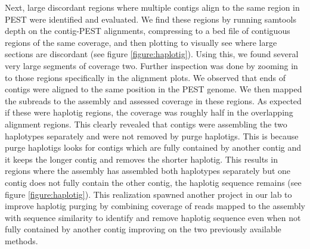 \par{
Next, large discordant regions where multiple contigs align to the same region in PEST were identified and evaluated. We find these regions by running samtools depth on the contig-PEST alignments, compressing to a bed file of contiguous regions of the same coverage, and then plotting to visually see where large sections are discordant (see figure \ref{figure:haplotig}). Using this, we found several very large segments of coverage two. Further inspection was done by zooming in to those regions specifically in the alignment plots. We observed that ends of contigs were aligned to the same position in the PEST genome. We then mapped the subreads to the assembly and assessed coverage in these regions. As expected if these were haplotig regions, the coverage was roughly half in the overlapping alignment regions. This clearly revealed that contigs were assembling the two haplotypes separately and were not removed by purge haplotigs. This is because purge haplotigs looks for contigs which are fully contained by another contig and it keeps the longer contig and removes the shorter haplotig. This results in regions where the assembly has assembled both haplotypes separately but one contig does not fully contain the other contig, the haplotig sequence remains (see figure \ref{figure:haplotig}). This realization spawned another project in our lab to improve haplotig purging by combining coverage of reads mapped to the assembly with sequence similarity to identify and remove haplotig sequence even when not fully contained by another contig\cite{purgedups} improving on the two previously available methods\cite{purge}\cite{haplomerger}.
}


